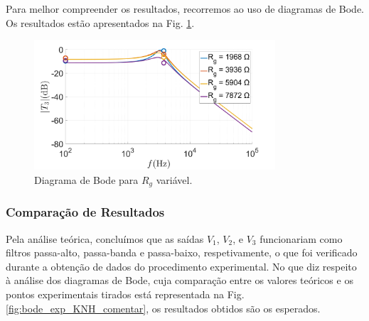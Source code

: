 \par
Para melhor compreender os resultados, recorremos ao uso de diagramas de Bode. Os resultados estão apresentados na Fig. \ref{fig:var_pot}. \par
\begin{figure}[h!]
    \centering
    \includegraphics[width = 0.8\textwidth]{Imagens/1_5_6_bodeTheoreticalPotentiometer3.png}
    \caption{Diagrama de Bode para $R_g$ variável.}
    \label{fig:var_pot}
\end{figure}
\par


\subsubsection{Comparação de Resultados}
Pela análise teórica, concluímos que as saídas $V_1$, $V_2$, e $V_3$ funcionariam como filtros passa-alto, passa-banda e passa-baixo, respetivamente, o que foi verificado durante a obtenção de dados do procedimento experimental. No que diz respeito à análise dos diagramas de Bode, cuja comparação entre os valores teóricos e os pontos experimentais tirados está representada na Fig. \ref{fig:bode_exp_KNH_comentar}, os resultados obtidos são os esperados.

